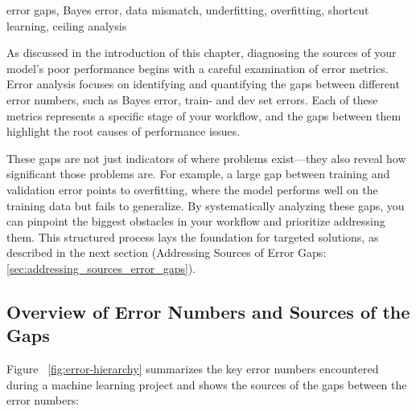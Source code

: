 \documentclass[12pt,openany]{book}
\begin{document}
\begin{keywordsbox}
error gaps, Bayes error, data mismatch, underfitting, overfitting, shortcut learning, ceiling analysis
\end{keywordsbox}

As discussed in the introduction of this chapter, diagnosing the sources of your model’s poor performance begins with a careful examination of error metrics. Error analysis focuses on identifying and quantifying the gaps between different error numbers, such as Bayes error, train- and dev set errors. Each of these metrics represents a specific stage of your workflow, and the gaps between them highlight the root causes of performance issues. \newline

These gaps are not just indicators of where problems exist—they also reveal how significant those problems are. For example, a large gap between training and validation error points to overfitting, where the model performs well on the training data but fails to generalize. By systematically analyzing these gaps, you can pinpoint the biggest obstacles in your workflow and prioritize addressing them. This structured process lays the foundation for targeted solutions, as described in the next section (Addressing Sources of Error Gaps: \ref{sec:addressing_sources_error_gaps}).

\subsection{Overview of Error Numbers and Sources of the Gaps}

Figure ~\ref{fig:error-hierarchy} summarizes the key error numbers encountered during a machine learning project and shows the sources of the gaps between the error numbers:
\end{document}
